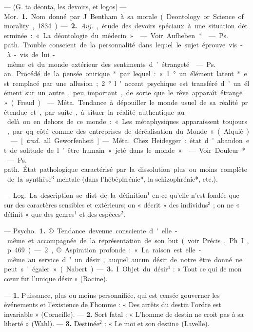 \begin{itemize}[leftmargin=1cm, label=, itemsep=1pt]
 — (G. ta deonta, les devoirs,
et logos] — \si{Mor.} {\bf 1.} Nom donné par
J. Bentham à sa morale (Deontology
or Science of morality, 1834). —
 {\bf 2.} {\it Auj.}, étude des devoirs spéciaux
à une situation déterminée : « La
déontologie du médecin ».

 — Voir Aufheben*.

 — \si{Ps. path.}
Trouble conscient de la personnalité
dans lequel le sujet éprouve vis-à-vis
de lui-même et du monde extérieur
des sentiments d’étrangeté.

 — \si{Ps. an.} Procédé de la
pensée onirique* par lequel : « 1° un
élément latent* est remplacé par
une allusion ; 2° l'accent psychique
est transféré d’un élément sur un
autre, peu important, de sorte que
le rêve apparaît étrange » (Freud).

 — \si{Méta.} Tendance à
dépouiller le monde usuel de sa
réalité prétendue et, par suite, à
situer la réalité authentique au-delà ou en dehors de ce monde :
« Les métaphysiques apparaissent
toujours, par qq. côté comme des
entreprises de déréalisation du
Monde » (Alquié).

 — [{\it trad.} all. Geworfenheit] —
\si{Méta.} Chez Heidegger : état d'abandon
et de solitude de l’être humain « jeté
dans le monde ».

 — Voir Douleur*.

 — \si{Ps. path.}
État pathologique caractérisé par la
dissolution plus ou moins complète
de la synthèse$^3$ mentale (dans
l'hébéphrénie*, la schizophrénie*,
etc.).

 — \si{Log.} La description
se dist. de la définition$^1$ en ce qu’elle
n’est fondée que sur des caractères
sensibles et extérieurs; on « décrit »
des individus$^3$ ; on ne « définit » que
des genres$^1$ et des espèces$^2$.

 — \si{Psycho.} {\bf 1.} © Tendance devenue consciente d'elle-même et
accompagnée de la représentation
de son but (voir Précis, Ph. I, p. 469).
— 2, © Aspiration profonde : « La
raison est elle-même au service d’un
désir, auquel aucun désir de notre
être donné ne peut s'égaler » (Nabert). — {\bf 3.} I Objet du désir$^1$ : « Tout
ce qui de mon cœur fut l’unique
désir » (Racine).

 — {\bf 1.} Puissance, plus ou moins
personnifiée, qui est censée gouverner les événements et l'existence de
Fhomme : « Des arrêts du destin
l’ordre est invariable » (Corneille). —
 {\bf 2.} Sort fatal : « L'homme de destin
ne croit pas à sa liberté » (Wahl). —
 {\bf 3.} Destinée$^2$ : « Le moi et son destin»
(Lavelle).


\end{itemize}
